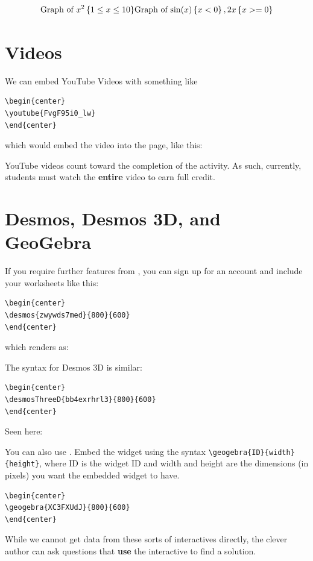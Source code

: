 \documentclass{ximera}
\begin{document}
\[
  \text{Graph of $x^2 \left\{ 1 \leq x \leq 10 \right\}$}
  \text{Graph of $ \sin(x)\left\{x<0\right\}, 2x\left\{ x>=0 \right\} $}
\]
\section{Videos}

We can embed YouTube Videos with something like
\begin{verbatim}
\begin{center}
\youtube{FvgF95i0_lw}
\end{center}
\end{verbatim}
which would embed the video into the page, like this:
\begin{center}
\end{center}

\begin{warning}
  YouTube videos count toward the completion of the activity. As such,
  currently, students must watch the \textbf{entire} video to earn full credit.
\end{warning}

\section{Desmos, Desmos 3D, and GeoGebra}

If you require further features from
, you can sign up for an account
and include your worksheets like this:
\begin{verbatim}
\begin{center}
\desmos{zwywds7med}{800}{600}
\end{center}
\end{verbatim}
which renders as:
\begin{center}
\end{center}

The syntax for Desmos 3D is similar:
\begin{verbatim}
\begin{center}
\desmosThreeD{bb4exrhrl3}{800}{600}
\end{center}
\end{verbatim}
Seen here:
\begin{center}
\end{center}

You can also use . Embed the
widget using the syntax \verb|\geogebra{ID}{width}{height}|, where ID
is the widget ID and width and height are the dimensions (in pixels)
you want the embedded widget to have.
\begin{verbatim}
\begin{center}
\geogebra{XC3FXUdJ}{800}{600}
\end{center}
\end{verbatim}
\begin{center}
\end{center}

While we cannot get data from these sorts of interactives directly, the clever
author can ask questions that \textbf{use} the interactive to find a solution.
\end{document}
